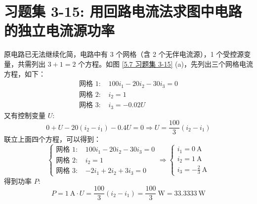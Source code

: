 \documentclass[UTF8]{report}
\theoremstyle{MyLineTheoremStyle} %
\theoremstyle{MyBlockTheoremStyle} %
\theoremstyle{MySubsubsectionStyle} %
\begin{document}
\section{习题集 3-15: 用回路电流法求图中电路的独立电流源功率}

原电路已无法继续化简，电路中有 3 个网格（含 2 个无伴电流源），1 个受控源变量，共需列出 $3 + 1 = 2$ 个方程。如图 \ref{5.7 习题集 3-15} (a)，先列出三个网格电流方程，如下：
\begin{align}
    \text{网格 1: } & 100 i_1 - 20i_2 - 30i_3 = 0 \\ 
    \text{网格 2: } & i_2 = 1 \\ 
    \text{网格 3: } & i_3 = -0.02 U
\end{align}
又有控制变量 $U$: 
\begin{equation}
0 + U - 20(i_2 - i_1) - 0.4 U = 0 \Longrightarrow U = \frac{100}{3}(i_2 - i_1)
\end{equation}
联立上面四个方程，可以得到：
\begin{equation}
\begin{cases}
    \text{网格 1: } & 100 i_1 - 20i_2 - 30i_3 = 0 \\ 
    \text{网格 2: } & i_2 = 1 \\ 
    \text{网格 3: } & -2 i_1 + 2i_2 +3 i_3 = 0
\end{cases}
\Longrightarrow 
\begin{cases}
    i_1 = 0 \ \mathrm{A} \\ 
    i_2 = 1 \ \mathrm{A} \\ 
    i_3 = -\frac{2}{3} \ \mathrm{A}
\end{cases}
\end{equation}
得到功率 $P$:
\begin{equation}
    P = 1 \ \mathrm{A}\cdot U = \frac{100}{3}(i_2 - i_1) = \frac{100}{3} \ \mathrm{W} = 33.3333 \ \mathrm{W}
\end{equation}
\end{document}
